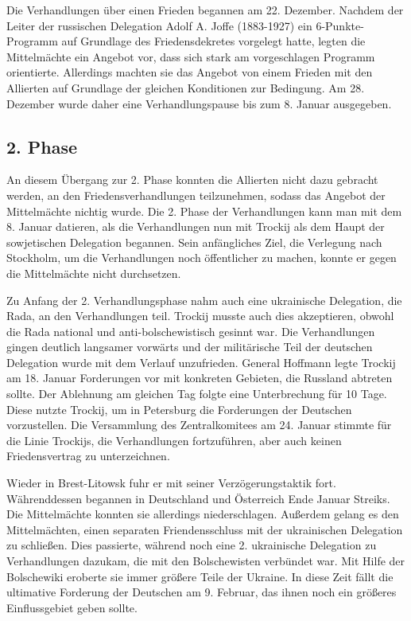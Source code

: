 \documentclass{../../sem_paper}
\begin{document}
Die Verhandlungen über einen Frieden begannen am 22. Dezember. 
Nachdem der Leiter der russischen Delegation Adolf A. Joffe (1883-1927) ein 6-Punkte-Programm auf Grundlage des Friedensdekretes vorgelegt hatte, legten die Mittelmächte ein Angebot vor, dass sich stark am vorgeschlagen Programm orientierte. Allerdings machten sie das Angebot von einem Frieden mit den Allierten auf Grundlage der gleichen Konditionen zur Bedingung. Am 28. Dezember wurde daher eine Verhandlungspause bis zum 8. Januar ausgegeben.

\subsection{2. Phase}
An diesem Übergang zur 2. Phase konnten die Allierten nicht dazu gebracht werden, an den Friedensverhandlungen teilzunehmen, sodass das Angebot der Mittelmächte nichtig wurde. Die 2. Phase der Verhandlungen kann man mit dem 8. Januar datieren, als die Verhandlungen nun mit Trockij als dem Haupt der sowjetischen Delegation begannen. Sein anfängliches Ziel, die Verlegung nach Stockholm, um die Verhandlungen noch öffentlicher zu machen, konnte er gegen die Mittelmächte nicht durchsetzen.

Zu Anfang der 2. Verhandlungsphase nahm auch eine ukrainische Delegation, die Rada, an den Verhandlungen teil. Trockij musste auch dies akzeptieren, obwohl die Rada national und anti-bolschewistisch gesinnt war.
Die Verhandlungen gingen deutlich langsamer vorwärts und der militärische Teil der deutschen Delegation wurde mit dem Verlauf unzufrieden. General Hoffmann legte Trockij am 18. Januar Forderungen vor mit konkreten Gebieten, die Russland abtreten sollte. Der Ablehnung am gleichen Tag folgte eine Unterbrechung für 10 Tage. Diese nutzte Trockij, um in Petersburg die Forderungen der Deutschen vorzustellen. Die Versammlung des Zentralkomitees am 24. Januar stimmte für die Linie Trockijs, die Verhandlungen fortzuführen, aber auch keinen Friedensvertrag zu unterzeichnen.

Wieder in Brest-Litowsk fuhr er mit seiner Verzögerungstaktik fort. Währenddessen begannen in Deutschland und Österreich Ende Januar Streiks. Die Mittelmächte konnten sie allerdings niederschlagen. Außerdem gelang es den Mittelmächten, einen separaten Friendensschluss mit der ukrainischen Delegation zu schließen. Dies passierte, während noch eine 2. ukrainische Delegation zu Verhandlungen dazukam, die mit den Bolschewisten verbündet war. Mit Hilfe der Bolschewiki eroberte sie immer größere Teile der Ukraine. In diese Zeit fällt die ultimative Forderung der Deutschen am 9. Februar, das ihnen noch ein größeres Einflussgebiet geben sollte.
\end{document}

